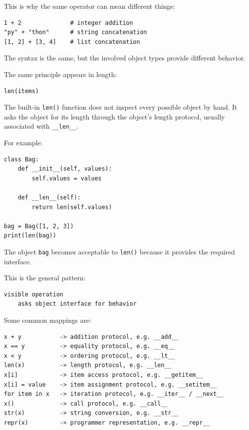 This is why the same operator can mean different things:

\begin{verbatim}
1 + 2              # integer addition
"py" + "thon"      # string concatenation
[1, 2] + [3, 4]    # list concatenation
\end{verbatim}

The syntax is the same, but the involved object types provide different behavior.

The same principle appears in length:

\begin{verbatim}
len(items)
\end{verbatim}

The built-in \texttt{len()} function does not inspect every possible object by hand. It asks the object for its length through the object's length protocol, usually associated with \texttt{\_\_len\_\_}.

For example:

\begin{verbatim}
class Bag:
    def __init__(self, values):
        self.values = values

    def __len__(self):
        return len(self.values)

bag = Bag([1, 2, 3])
print(len(bag))
\end{verbatim}

The object \texttt{bag} becomes acceptable to \texttt{len()} because it provides the required interface.

This is the general pattern:

\begin{verbatim}
visible operation
    asks object interface for behavior
\end{verbatim}

Some common mappings are:

\begin{verbatim}
x + y           -> addition protocol, e.g. __add__
x == y          -> equality protocol, e.g. __eq__
x < y           -> ordering protocol, e.g. __lt__
len(x)          -> length protocol, e.g. __len__
x[i]            -> item access protocol, e.g. __getitem__
x[i] = value    -> item assignment protocol, e.g. __setitem__
for item in x   -> iteration protocol, e.g. __iter__ / __next__
x()             -> call protocol, e.g. __call__
str(x)          -> string conversion, e.g. __str__
repr(x)         -> programmer representation, e.g. __repr__
\end{verbatim}


